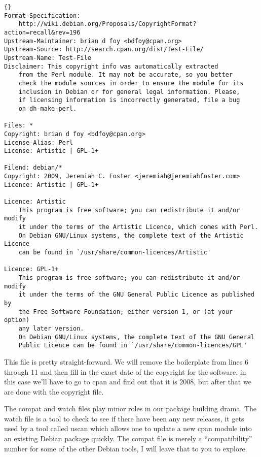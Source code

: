 \begin{lstlisting}[frame=trbl,label=cl:debs_cpan:copyright-file,caption=copyright]{}
Format-Specification:
    http://wiki.debian.org/Proposals/CopyrightFormat?action=recall&rev=196
Upstream-Maintainer: brian d foy <bdfoy@cpan.org>
Upstream-Source: http://search.cpan.org/dist/Test-File/
Upstream-Name: Test-File
Disclaimer: This copyright info was automatically extracted 
    from the Perl module. It may not be accurate, so you better 
    check the module sources in order to ensure the module for its 
    inclusion in Debian or for general legal information. Please, 
    if licensing information is incorrectly generated, file a bug 
    on dh-make-perl.

Files: *
Copyright: brian d foy <bdfoy@cpan.org>
License-Alias: Perl
License: Artistic | GPL-1+

Filend: debian/*
Copyright: 2009, Jeremiah C. Foster <jeremiah@jeremiahfoster.com>
Licence: Artistic | GPL-1+

Licence: Artistic
    This program is free software; you can redistribute it and/or modify
    it under the terms of the Artistic Licence, which comes with Perl.
    On Debian GNU/Linux systems, the complete text of the Artistic Licence
    can be found in `/usr/share/common-licences/Artistic'

Licence: GPL-1+
    This program is free software; you can redistribute it and/or modify
    it under the terms of the GNU General Public Licence as published by
    the Free Software Foundation; either version 1, or (at your option)
    any later version.
    On Debian GNU/Linux systems, the complete text of the GNU General
    Public Licence can be found in `/usr/share/common-licences/GPL'
\end{lstlisting}

This f\hbox{}ile is pretty straight-forward. We will remove the boilerplate from lines
6 through 11 and then f\hbox{}ill in the exact date of the copyright for the software,
in this case we'll have to go to cpan and f\hbox{}ind out that it is 2008, but after
that we are done with the copyright f\hbox{}ile.

The compat and watch f\hbox{}iles play minor roles in our package building drama. The
watch f\hbox{}ile is a tool to check to see if there have been any new releases, it
gets used by a tool called uscan which allows one to update a new cpan module
into an existing Debian package quickly. The compat f\hbox{}ile is merely a
``compatibility'' number for some of the other Debian tools, I will leave that
to you to explore. 




